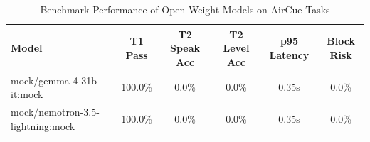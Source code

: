 \begin{table}[htbp]
\centering
\small
\caption{Benchmark Performance of Open-Weight Models on AirCue Tasks}
\label{tab:benchmark_summary}
\begin{tabular}{lccccc}
\toprule
\textbf{Model} & \textbf{T1 Pass} & \textbf{T2 Speak Acc} & \textbf{T2 Level Acc} & \textbf{p95 Latency} & \textbf{Block Risk} \\
\midrule
mock/\allowbreak gemma-4-31b-it:mock & 100.0\% & 0.0\% & 0.0\% & 0.35s & 0.0\% \\
mock/\allowbreak nemotron-3.5-lightning:mock & 100.0\% & 0.0\% & 0.0\% & 0.35s & 0.0\% \\
\bottomrule
\end{tabular}
\end{table}
